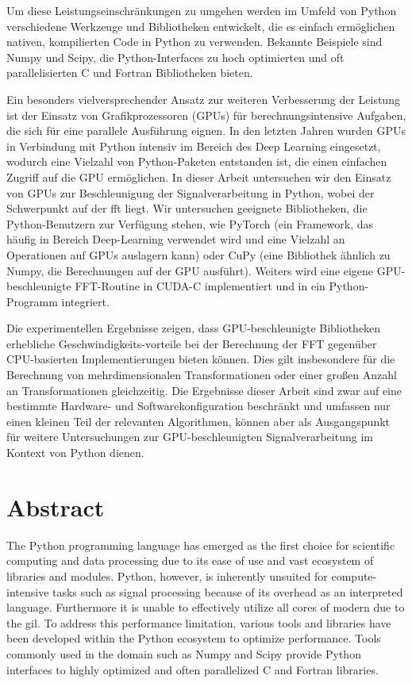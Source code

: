 Um diese Leistungseinschränkungen zu umgehen werden im Umfeld von Python verschiedene Werkzeuge und Bibliotheken entwickelt, die es einfach ermöglichen nativen, kompilierten Code in Python zu verwenden.
Bekannte Beispiele sind Numpy und Scipy, die Python-Interfaces zu hoch optimierten und oft parallelisierten C und Fortran Bibliotheken bieten.

Ein besonders vielversprechender Ansatz zur weiteren Verbesserung der Leistung ist der Einsatz von Grafikprozessoren (GPUs) für berechnungsintensive Aufgaben, die sich für eine parallele Ausführung eignen.
In den letzten Jahren wurden GPUs in Verbindung mit Python intensiv im Bereich des Deep Learning eingesetzt, wodurch eine Vielzahl von Python-Paketen entstanden ist, die einen einfachen Zugriff auf die GPU ermöglichen.
In dieser Arbeit untersuchen wir den Einsatz von GPUs zur Beschleunigung der Signalverarbeitung in Python, wobei der Schwerpunkt auf der \acrfull{fft} liegt.
Wir untersuchen geeignete Bibliotheken, die Python-Benutzern zur Verfügung stehen, wie PyTorch (ein Framework, das häufig in Bereich Deep-Learning verwendet wird und eine Vielzahl an Operationen auf GPUs auslagern kann) oder CuPy (eine Bibliothek ähnlich zu Numpy, die Berechnungen auf der GPU ausführt).
Weiters wird eine eigene GPU-beschleunigte FFT-Routine in CUDA-C implementiert und in ein Python-Programm integriert.

Die experimentellen Ergebnisse zeigen, dass GPU-beschleunigte Bibliotheken erhebliche Geschwindigkeits-vorteile bei der Berechnung der FFT gegenüber CPU-basierten Implementierungen bieten können.
Dies gilt insbesondere für die Berechnung von mehrdimensionalen Transformationen oder einer großen Anzahl an  Transformationen gleichzeitig.
Die Ergebnisse dieser Arbeit sind zwar auf eine bestimmte Hardware- und Softwarekonfiguration beschränkt und umfassen nur einen kleinen Teil der relevanten Algorithmen, können aber als Ausgangspunkt für weitere Untersuchungen zur GPU-beschleunigten Signalverarbeitung im Kontext von Python dienen.

\section*{Abstract}
The Python programming language has emerged as the first choice for scientific computing and data processing due to its ease of use and vast ecosystem of libraries and modules.
Python, however, is inherently unsuited for compute-intensive tasks such as signal processing because of its overhead as an interpreted language.
Furthermore it is unable to effectively utilize all cores of modern  due to the \acrfull{gil}.
To address this performance limitation, various tools and libraries have been developed within the Python ecosystem to optimize performance.
Tools commonly used in the domain such as Numpy and Scipy provide Python interfaces to highly optimized and often parallelized C and Fortran libraries.

